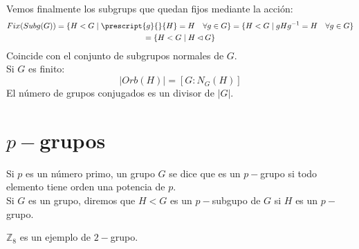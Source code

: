 Vemos finalmente los subgrups que quedan fijos mediante la acción:
\begin{multline*}
    Fix(Subg(G)) = \{H < G \mid \prescript{g}{}{H} = H \quad \forall g\in G\} = \{H<G \mid gHg^{-1}= H \quad \forall g\in G\} \\ = \{H< G \mid H\lhd G\}
\end{multline*}
Coincide con el conjunto de subgrupos normales de $G$.\\

Si $G$ es finito:
\begin{equation*}
    |Orb(H)| = [G:N_G(H)]
\end{equation*}
El número de grupos conjugados es un divisor de $|G|$.

\section{$p-$grupos}
\begin{definicion}[$p-$grupo]
    Si $p$ es un número primo, un grupo $G$ se dice que es un $p-$grupo si todo elemento tiene orden una potencia de $p$.\\
    
    \noindent
    Si $G$ es un grupo, diremos que $H<G$ es un $p-$subgupo de $G$ si $H$ es un $p-$grupo.
\end{definicion}

\begin{ejemplo}
    $\mathbb{Z}_8$ es un ejemplo de $2-$grupo.
\end{ejemplo}

